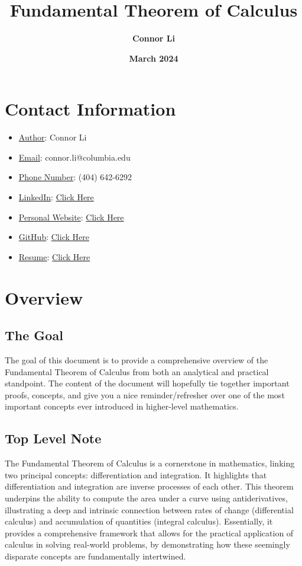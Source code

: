 \documentclass[8pt]{extarticle}
\title{\textbf{Fundamental Theorem of Calculus}}
\author{\textbf{Connor Li}}
\date{\textbf{March 2024}}
\begin{document}
\maketitle


\section*{Contact Information}
\begin{itemize}
    \item \underline{Author}: Connor Li
    \item \underline{Email}: connor.li@columbia.edu
    \item \underline{Phone Number}: (404) 642-6292
    \item \underline{LinkedIn}: \href{https://www.linkedin.com/in/connor-li-4871a71a9/}{Click Here}
    \item \underline{Personal Website}: \href{https://connorli18.github.io/}{Click Here}
    \item \underline{GitHub}: \href{https://github.com/connorli18}{Click Here}
    \item \underline{Resume}: \href{https://drive.google.com/file/d/1G4QryPZy70d9OCKWtcJPA6su5gIfjmIe/view?usp=sharing}{Click Here}
\end{itemize}
\vspace{2cm}
\tableofcontents

\pagebreak
\section{Overview}
\subsection{The Goal}
The goal of this document is to provide a comprehensive overview of the Fundamental Theorem of Calculus from both an analytical and practical standpoint. The content of the document will hopefully tie together important proofs, concepts, and give you a nice reminder/refresher over one of the most important concepts ever introduced in higher-level mathematics.
\subsection{Top Level Note}
The Fundamental Theorem of Calculus is a cornerstone in mathematics, linking two principal concepts: differentiation and integration. It highlights that differentiation and integration are inverse processes of each other. This theorem underpins the ability to compute the area under a curve using antiderivatives, illustrating a deep and intrinsic connection between rates of change (differential calculus) and accumulation of quantities (integral calculus). Essentially, it provides a comprehensive framework that allows for the practical application of calculus in solving real-world problems, by demonstrating how these seemingly disparate concepts are fundamentally intertwined.
\end{document}
